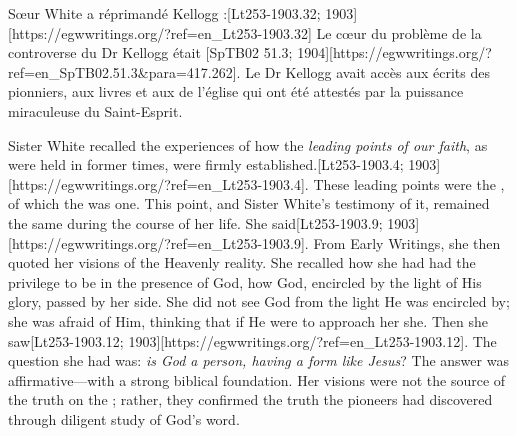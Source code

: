 Sœur White a réprimandé Kellogg :[Lt253-1903.32; 1903][https://egwwritings.org/?ref=en\_Lt253-1903.32] Le cœur du problème de la controverse du Dr Kellogg était [SpTB02 51.3; 1904][https://egwwritings.org/?ref=en\_SpTB02.51.3&para=417.262]. Le Dr Kellogg avait accès aux écrits des pionniers, aux livres et aux  de l'église qui ont été attestés par la puissance miraculeuse du Saint-Esprit.


Sister White recalled the experiences of how the \textit{leading points of our faith}, as were held in former times, were firmly established.[Lt253-1903.4; 1903][https://egwwritings.org/?ref=en\_Lt253-1903.4]. These leading points were the , of which the  was one. This point, and Sister White’s testimony of it, remained the same during the course of her life.  She said[Lt253-1903.9; 1903][https://egwwritings.org/?ref=en\_Lt253-1903.9]. From Early Writings, she then quoted her visions of the Heavenly reality. She recalled how she had had the privilege to be in the presence of God, how God, encircled by the light of His glory, passed by her side. She did not see God from the light He was encircled by; she was afraid of Him, thinking that if He were to approach her she. Then she saw[Lt253-1903.12; 1903][https://egwwritings.org/?ref=en\_Lt253-1903.12]. The question she had was: \textit{is God a person, having a form like Jesus}? The answer was affirmative—with a strong biblical foundation. Her visions were not the source of the truth on the ; rather, they confirmed the truth the pioneers had discovered through diligent study of God’s word.


